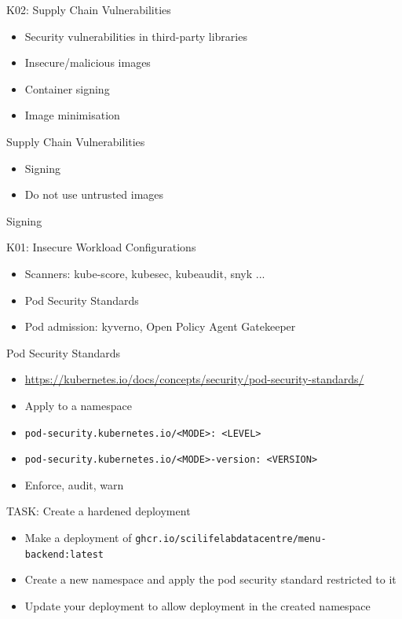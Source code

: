 \documentclass{dcpresentation}
\begin{document}
\begin{frame}{K02: Supply Chain Vulnerabilities}
  \begin{itemize}
  \item Security vulnerabilities in third-party libraries
  \item Insecure/malicious images
  \item Container signing
  \item Image minimisation
  \end{itemize}
\end{frame}

\begin{frame}{Supply Chain Vulnerabilities}
  \begin{itemize}
  \item Signing
  \item Do not use untrusted images
  \end{itemize}
  Signing

\end{frame}


\begin{frame}{K01: Insecure Workload Configurations}
  \begin{itemize}
  \item Scanners: kube-score, kubesec, kubeaudit, snyk ...
  \item Pod Security Standards
  \item Pod admission: kyverno, Open Policy Agent Gatekeeper
  \end{itemize}
\end{frame}

\begin{frame}{Pod Security Standards}
  \begin{itemize}
  \item \url{https://kubernetes.io/docs/concepts/security/pod-security-standards/}
  \item Apply to a namespace
  \item \texttt{pod-security.kubernetes.io/<MODE>: <LEVEL>}
  \item \texttt{pod-security.kubernetes.io/<MODE>-version: <VERSION>}
  \item Enforce, audit, warn
  \end{itemize}

\end{frame}



\begin{frame}{TASK: Create a hardened deployment}
  \begin{itemize}
  \item Make a deployment of \texttt{ghcr.io/scilifelabdatacentre/menu-backend:latest}
  \item Create a new namespace and apply the pod security standard restricted to it
  \item Update your deployment to allow deployment in the created namespace
  \end{itemize}
\end{frame}
\end{document}
